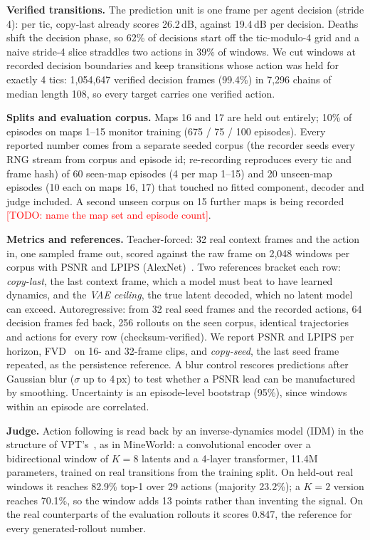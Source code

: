 \documentclass[10pt]{article}
\newcommand{\todo}[1]{\textcolor{red}{[TODO: #1]}}
\begin{document}
\textbf{Verified transitions.} The prediction unit is one frame per agent decision (stride 4): per tic, copy-last already scores 26.2\,dB, against 19.4\,dB per decision. Deaths shift the decision phase, so 62\% of decisions start off the tic-modulo-4 grid and a naive stride-4 slice straddles two actions in 39\% of windows. We cut windows at recorded decision boundaries and keep transitions whose action was held for exactly 4 tics: 1,054,647 verified decision frames (99.4\%) in 7,296 chains of median length 108, so every target carries one verified action.

\textbf{Splits and evaluation corpus.} Maps 16 and 17 are held out entirely; 10\% of episodes on maps 1--15 monitor training (675 / 75 / 100 episodes). Every reported number comes from a separate seeded corpus (the recorder seeds every RNG stream from corpus and episode id; re-recording reproduces every tic and frame hash) of 60 seen-map episodes (4 per map 1--15) and 20 unseen-map episodes (10 each on maps 16, 17) that touched no fitted component, decoder and judge included. A second unseen corpus on 15 further maps is being recorded \todo{name the map set and episode count}.

\textbf{Metrics and references.} Teacher-forced: 32 real context frames and the action in, one sampled frame out, scored against the raw frame on 2,048 windows per corpus with PSNR and LPIPS (AlexNet)~\citep{zhang2018lpips}. Two references bracket each row: \emph{copy-last}, the last context frame, which a model must beat to have learned dynamics, and the \emph{VAE ceiling}, the true latent decoded, which no latent model can exceed. Autoregressive: from 32 real seed frames and the recorded actions, 64 decision frames fed back, 256 rollouts on the seen corpus, identical trajectories and actions for every row (checksum-verified). We report PSNR and LPIPS per horizon, FVD~\citep{unterthiner2018fvd} on 16- and 32-frame clips, and \emph{copy-seed}, the last seed frame repeated, as the persistence reference. A blur control rescores predictions after Gaussian blur ($\sigma$ up to 4\,px) to test whether a PSNR lead can be manufactured by smoothing. Uncertainty is an episode-level bootstrap (95\%), since windows within an episode are correlated.

\textbf{Judge.} Action following is read back by an inverse-dynamics model (IDM) in the structure of VPT's~\citep{baker2022vpt}, as in MineWorld: a convolutional encoder over a bidirectional window of $K{=}8$ latents and a 4-layer transformer, 11.4M parameters, trained on real transitions from the training split. On held-out real windows it reaches 82.9\% top-1 over 29 actions (majority 23.2\%); a $K{=}2$ version reaches 70.1\%, so the window adds 13 points rather than inventing the signal. On the real counterparts of the evaluation rollouts it scores 0.847, the reference for every generated-rollout number.
\end{document}
